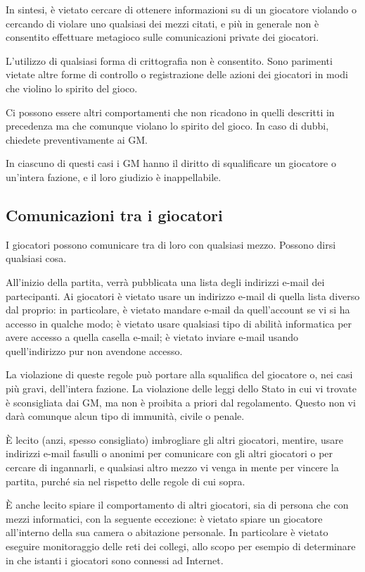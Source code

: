 \documentclass[a4paper,10pt]{article}
\begin{document}
In sintesi, è vietato cercare di ottenere informazioni su di un giocatore violando o cercando di violare uno qualsiasi dei mezzi citati, e più in generale non è consentito effettuare metagioco sulle comunicazioni private dei giocatori.

L'utilizzo di qualsiasi forma di crittografia non è consentito. Sono parimenti vietate altre forme di controllo o registrazione delle azioni dei giocatori in modi che violino lo spirito del gioco.

Ci possono essere altri comportamenti che non ricadono in quelli descritti in precedenza ma che comunque violano lo spirito del gioco. In caso di dubbi, chiedete preventivamente ai GM.

In ciascuno di questi casi i GM hanno il diritto di squalificare un giocatore o un'intera fazione, e il loro giudizio è inappellabile.

\subsection{Comunicazioni tra i giocatori}

I giocatori possono comunicare tra di loro con qualsiasi mezzo. Possono dirsi qualsiasi cosa.

All'inizio della partita, verrà pubblicata una lista degli indirizzi e-mail dei partecipanti. Ai giocatori è vietato usare un indirizzo e-mail di quella lista diverso dal proprio: in particolare, è vietato mandare e-mail da quell'account se vi si ha accesso in qualche modo; è vietato usare qualsiasi tipo di abilità informatica per avere accesso a quella casella e-mail; è vietato inviare e-mail usando quell'indirizzo pur non avendone accesso.

La violazione di queste regole può portare alla squalifica del giocatore o, nei casi più gravi, dell'intera fazione. La violazione delle leggi dello Stato in cui vi trovate è sconsigliata dai GM, ma non è proibita a priori dal regolamento. Questo non vi darà comunque alcun tipo di immunità, civile o penale.

È lecito (anzi, spesso consigliato) imbrogliare gli altri giocatori, mentire, usare indirizzi e-mail fasulli o anonimi per comunicare con gli altri giocatori o per cercare di ingannarli, e qualsiasi altro mezzo vi venga in mente per vincere la partita, purché sia nel rispetto delle regole di cui sopra.

È anche lecito spiare il comportamento di altri giocatori, sia di persona che con mezzi informatici, con la seguente eccezione: è vietato spiare un giocatore all'interno della sua camera o abitazione personale. In particolare è vietato eseguire monitoraggio delle reti dei collegi, allo scopo per esempio di determinare in che istanti i giocatori sono connessi ad Internet.
\end{document}
